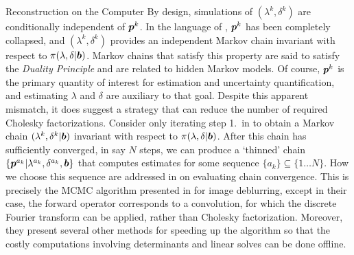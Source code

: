 \begin{chapter}{Reconstruction on the Computer}
By design, simulations of $(\lambda^k,\delta^k)$ are conditionally independent of $\mbox{\boldmath$p$}^k$.
In the language of \citep{van2008partially}, $\mbox{\boldmath$p$}^k$ has been completely collapsed, and $(\lambda^k,\delta^k)$ provides an independent Markov chain invariant with respect to $\pi(\lambda,\delta|\mbox{\boldmath$b$})$.
Markov chains that satisfy this property are said to satisfy the \emph{Duality Principle} \citep[Section 9.2.3]{robert2013monte} and are related to hidden Markov models. %
Of course, $\mbox{\boldmath$p$}^k$ is the primary quantity of interest for estimation and uncertainty quantification, and estimating $\lambda$ and $\delta$ are auxiliary to that goal.
Despite this apparent mismatch, it does suggest a strategy that can reduce the number of required Cholesky factorizations.
Consider only iterating step 1.~in  to obtain a Markov chain $(\lambda^k,\delta^k|\mbox{\boldmath$b$})$ invariant with respect to $\pi(\lambda,\delta|\mbox{\boldmath$b$})$. 
After this chain has sufficiently converged, in say $N$ steps, we can produce a `thinned' chain $\{\mbox{\boldmath$p$}^{a_k}|\lambda^{a_k},\delta^{a_k},\mbox{\boldmath$b$}\}$ that computes estimates for some sequence $\{a_k\} \subseteq \{1\dots N\}$.
How we choose this sequence are addressed in  on evaluating chain convergence.
This is precisely the MCMC algorithm presented in \citep{fox2015fast} for image deblurring, except in their case, the forward operator corresponds to a convolution, for which the discrete Fourier transform can be applied, rather than Cholesky factorization.
Moreover, they present several other methods for speeding up the algorithm so that the costly computations involving determinants and linear solves can be done offline.


\end{chapter}
